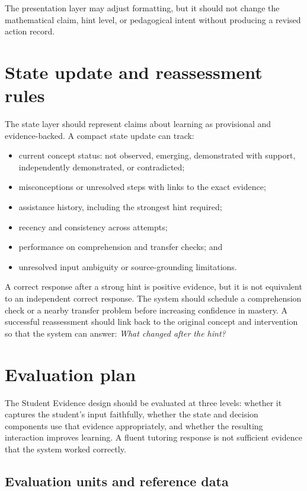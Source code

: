 \documentclass[11pt]{article}
\begin{document}
The presentation layer may adjust formatting, but it should not change the mathematical claim, hint level, or pedagogical intent without producing a revised action record.

\section{State update and reassessment rules}

The state layer should represent claims about learning as provisional and evidence-backed. A compact state update can track:

\begin{itemize}
    \item current concept status: not observed, emerging, demonstrated with support, independently demonstrated, or contradicted;
    \item misconceptions or unresolved steps with links to the exact evidence;
    \item assistance history, including the strongest hint required;
    \item recency and consistency across attempts;
    \item performance on comprehension and transfer checks; and
    \item unresolved input ambiguity or source-grounding limitations.
\end{itemize}

A correct response after a strong hint is positive evidence, but it is not equivalent to an independent correct response. The system should schedule a comprehension check or a nearby transfer problem before increasing confidence in mastery. A successful reassessment should link back to the original concept and intervention so that the system can answer: \emph{What changed after the hint?}

\section{Evaluation plan}

The Student Evidence design should be evaluated at three levels: whether it captures the student's input faithfully, whether the state and decision components use that evidence appropriately, and whether the resulting interaction improves learning. A fluent tutoring response is not sufficient evidence that the system worked correctly.

\subsection{Evaluation units and reference data}
\end{document}
